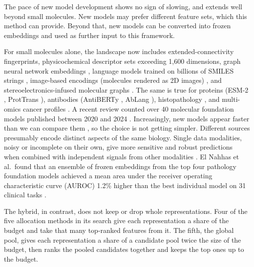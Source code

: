 The pace of new model development shows no sign of slowing, and extends well beyond small molecules. New models may prefer different feature sets, which this method can provide. Beyond that, new models can be converted into frozen embeddings and used as further input to this framework.

For small molecules alone, the landscape now includes extended-connectivity fingerprints, physicochemical descriptor sets exceeding 1,600 dimensions, graph neural network embeddings \citep{Yang2019, Fang2022}, language models trained on billions of SMILES strings \citep{ross2022}, image-based encodings (molecules rendered as 2D images) \citep{Zeng2022}, and stereoelectronics-infused molecular graphs \citep{Boiko2025}. The same is true for proteins (ESM-2 \citep{Lin2023}, ProtTrans \citep{Elnaggar2022}), antibodies (AntiBERTy \citep{Ruffolo2021}, AbLang \citep{Olsen2022}), histopathology \citep{ElNahhas2025}, and multi-omics cancer profiles \citep{Steyaert2023}. A recent review counted over 40 molecular foundation models published between 2020 and 2024 \citep{Song2026}. Increasingly, new models appear faster than we can compare them \citep{Bommasani2021}, so the choice is not getting simpler. Different sources presumably encode distinct aspects of the same biology. Single data modalities, noisy or incomplete on their own, give more sensitive and robust predictions when combined with independent signals from other modalities \citep{Steyaert2023}. El Nahhas et al.\ found that an ensemble of frozen embeddings from the top four pathology foundation models achieved a mean area under the receiver operating characteristic curve (AUROC) 1.2\% higher than the best individual model on 31 clinical tasks \citep{ElNahhas2025}.

The hybrid, in contrast, does not keep or drop whole representations. Four of the five allocation methods in its search give each representation a share of the budget and take that many top-ranked features from it. The fifth, the global pool, gives each representation a share of a candidate pool twice the size of the budget, then ranks the pooled candidates together and keeps the top ones up to the budget.

